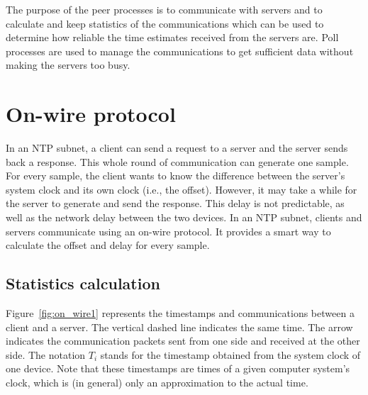 

The purpose of the peer processes is to communicate with servers and to
calculate and keep statistics of the communications which can be used to
determine how reliable the time estimates received from the servers are. Poll
processes are used to manage the communications to get sufficient data without
making the servers too busy.

\section{On-wire protocol}%
\label{sec:on_wire_protocol}
In an NTP subnet, a client can send a request to a server and the server sends
back a response. This whole round of communication can generate one sample. For
every sample, the client wants to know the difference between the server's
system clock and its own clock (i.e., the offset).  However, it may take a
while for the server to generate and send the response. This delay is not
predictable, as well as the network delay between the two devices. In an NTP
subnet, clients and servers communicate using an on-wire protocol. It provides
a smart way to calculate the offset and delay for every sample. 

\subsection{Statistics calculation}%
\label{sub:statistics_calculation}
Figure~\ref{fig:on_wire1} represents the timestamps and communications between
a client and a server. The vertical dashed line indicates the same time. The
arrow indicates the communication packets sent from one side and received at
the other side. The notation $T_i$ stands for the timestamp obtained from the
system clock of one device. Note that these timestamps are times of a given
computer system's clock, which is (in general) only an approximation to the
actual time.



